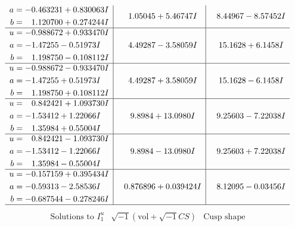 \documentclass[1p]{elsarticle_modified}
\theoremstyle{definition}
\newcommand{\I}{\sqrt{-1}}
\begin{document}
$$\begin{array}{c|c|c}
\begin{aligned}
a &= -0.463231 + 0.830063 I \\
b &= \phantom{-}1.120700 + 0.274244 I\end{aligned}
 & \phantom{-}1.05045 + 5.46747 I & \phantom{-}8.44967 - 8.57452 I \\ \hline\begin{aligned}
u &= -0.988672 + 0.933470 I \\
a &= -1.47255 - 0.51973 I \\
b &= \phantom{-}1.198750 - 0.108112 I\end{aligned}
 & \phantom{-}4.49287 - 3.58059 I & \phantom{-}15.1628 + 6.1458 I \\ \hline\begin{aligned}
u &= -0.988672 - 0.933470 I \\
a &= -1.47255 + 0.51973 I \\
b &= \phantom{-}1.198750 + 0.108112 I\end{aligned}
 & \phantom{-}4.49287 + 3.58059 I & \phantom{-}15.1628 - 6.1458 I \\ \hline\begin{aligned}
u &= \phantom{-}0.842421 + 1.093730 I \\
a &= -1.53412 + 1.22066 I \\
b &= \phantom{-}1.35984 + 0.55004 I\end{aligned}
 & \phantom{-}9.8984 + 13.0980 I & \phantom{-}9.25603 - 7.22038 I \\ \hline\begin{aligned}
u &= \phantom{-}0.842421 - 1.093730 I \\
a &= -1.53412 - 1.22066 I \\
b &= \phantom{-}1.35984 - 0.55004 I\end{aligned}
 & \phantom{-}9.8984 - 13.0980 I & \phantom{-}9.25603 + 7.22038 I \\ \hline\begin{aligned}
u &= -0.157159 + 0.395434 I \\
a &= -0.59313 - 2.58536 I \\
b &= -0.687544 - 0.278246 I\end{aligned}
 & \phantom{-}0.876896 + 0.039424 I & \phantom{-}8.12095 - 0.03456 I\\
 \hline 
 \end{array}$$\newpage$$\begin{array}{c|c|c}  
\text{Solutions to }I^u_{1}& \I (\text{vol} + \sqrt{-1}CS) & \text{Cusp shape}\\
 \hline 
\begin{aligned}

\end{aligned}
\end{array}$$
\end{document}
